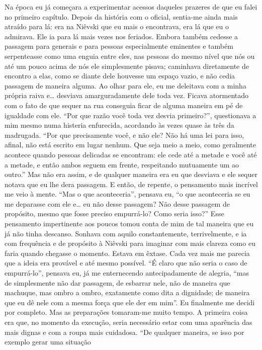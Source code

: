 Na época eu já começara a experimentar acessos daqueles prazeres de que
eu falei no primeiro capítulo. Depois da história com o oficial,
sentia-me ainda mais atraído para lá: era na Niêvski que eu mais o
encontrava, era lá que eu o admirava. Ele ia para lá mais vezes nos
feriados. Embora também cedesse a passagem para generais e para pessoas
especialmente eminentes e também serpenteasse como uma enguia entre
eles, nas pessoas do mesmo nível que nós ou até um pouco acima de nós
ele simplesmente pisava; caminhava diretamente de encontro a elas, como
se diante dele houvesse um espaço vazio, e não cedia passagem de
maneira alguma. Ao olhar para ele, eu me deleitava com a minha própria
raiva e\ldots{} desviava amarguradamente dele toda vez. Ficava atormentado
com o fato de que sequer na rua conseguia ficar de alguma maneira em pé
de igualdade com ele. “Por que razão você toda vez desvia primeiro?”,
questionava a mim mesmo numa histeria enfurecida, acordando às vezes
quase às três da madrugada. “Por que precisamente você, e não ele? Não
há uma lei para isso, afinal, não está escrito em lugar nenhum. Que
seja meio a meio, como geralmente acontece quando pessoas delicadas se
encontram: ele cede até a metade e você até a metade, e então ambos
seguem em frente, respeitando mutuamente um ao outro.” Mas não era
assim, e de qualquer maneira era eu que desviava e ele sequer notava
que eu lhe dera passagem. E então, de repente, o pensamento mais
incrível me veio à mente. “Mas o que aconteceria”, pensava eu, “o que
aconteceria se eu me deparasse com ele e\ldots{} eu não desse passagem? Não
desse passagem de propósito, mesmo que fosse preciso empurrá-lo? Como
seria isso?” Esse pensamento impertinente aos poucos tomou conta de
mim de tal maneira que eu já não tinha descanso. Sonhava com aquilo
constantemente, terrivelmente, e ia com frequência e de propósito à
Niêvski para imaginar com mais clareza como eu faria quando chegasse o
momento. Estava em êxtase. Cada vez mais me parecia que a ideia era
provável e até mesmo possível. “É claro que não seria o caso de
empurrá-lo”, pensava eu, já me enternecendo antecipadamente de alegria,
“mas de simplesmente não dar passagem, de esbarrar nele, não de maneira
que machuque, mas ombro a ombro, exatamente como dita a dignidade; de
maneira que eu dê nele com a mesma força que ele der em mim”. Eu
finalmente me decidi por completo. Mas as preparações tomaram-me muito
tempo. A primeira coisa era que, no momento da execução, seria
necessário estar com uma aparência das mais dignas e com a roupa mais
cuidadosa. “De qualquer maneira, se isso por exemplo gerar uma situação
